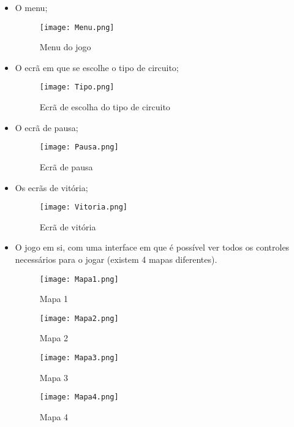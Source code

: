 \documentclass[a4paper]{report}
\begin{document}
\begin{itemize}
    \item O menu;
    
\begin{figure}[H]
    \centering
    \texttt{[image: Menu.png]}
    \caption{Menu do jogo}
    \label{fig:menu}
\end{figure}

    \item O ecrã em que se escolhe o tipo de circuito;
    
\begin{figure}[H]
    \centering
    \texttt{[image: Tipo.png]}
    \caption{Ecrã de escolha do tipo de circuito}
    \label{fig:menu}
\end{figure}

    \item O ecrã de pausa;
    
\begin{figure}[H]
    \centering
    \texttt{[image: Pausa.png]}
    \caption{Ecrã de pausa}
    \label{fig:menu}
\end{figure}

    \item Os ecrãs de vitória;
    
\begin{figure}[H]
    \centering
    \texttt{[image: Vitoria.png]}
    \caption{Ecrã de vitória}
    \label{fig:menu}
\end{figure}

    \item O jogo em si, com uma interface em que é possível ver todos os controles necessários para o jogar (existem 4 mapas diferentes).
    
\begin{figure}[H]
    \centering
    \texttt{[image: Mapa1.png]}
    \caption{Mapa 1}
    \label{fig:menu}
\end{figure}

\begin{figure}[H]
    \centering
    \texttt{[image: Mapa2.png]}
    \caption{Mapa 2}
    \label{fig:menu}
\end{figure}

\begin{figure}[H]
    \centering
    \texttt{[image: Mapa3.png]}
    \caption{Mapa 3}
    \label{fig:menu}
\end{figure}

\begin{figure}[H]
    \centering
    \texttt{[image: Mapa4.png]}
    \caption{Mapa 4}
    \label{fig:menu}
\end{figure}
\end{itemize}
\end{document}
